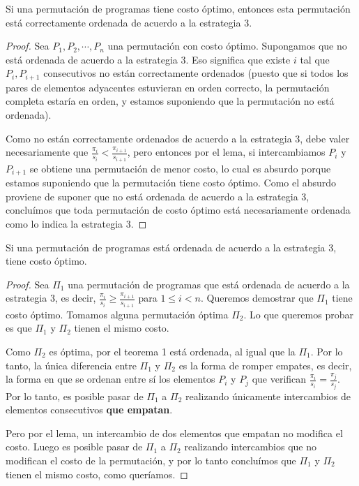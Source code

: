 \documentclass{article}
\begin{document}
\begin{teorema}
Si una permutación de programas tiene costo óptimo, entonces esta permutación está correctamente ordenada de acuerdo a la estrategia 3.
\end{teorema}
\begin{proof}
Sea $P_1, P_2, \cdots, P_n$ una permutación con costo óptimo. Supongamos que no está ordenada de acuerdo a la estrategia 3. Eso significa que existe
$i$ tal que $P_i, P_{i+1}$ consecutivos no están correctamente ordenados (puesto que si todos los pares de elementos adyacentes estuvieran en orden correcto,
la permutación completa estaría en orden, y estamos suponiendo que la permutación no está ordenada).

Como no están correctamente ordenados de acuerdo a la estrategia 3, debe valer necesariamente que $\frac{\pi_i}{s_i} < \frac{\pi_{i+1}}{s_{i+1}}$,
pero entonces por el lema, si intercambiamos $P_i$ y $P_{i+1}$ se obtiene una permutación de menor costo, lo cual es absurdo porque estamos suponiendo
que la permutación tiene costo óptimo. Como el absurdo proviene de suponer que no está ordenada de acuerdo a la estrategia 3, concluímos que toda permutación
de costo óptimo está necesariamente ordenada como lo indica la estrategia 3.
\end{proof}

\begin{teorema}
Si una permutación de programas está ordenada de acuerdo a la estrategia 3, tiene costo óptimo.
\end{teorema}
\begin{proof}
Sea $\Pi_1$ una permutación de programas que está ordenada de acuerdo a la estrategia 3, es decir, $\frac{\pi_i}{s_i} \geq \frac{\pi_{i+1}}{s_{i+1}}$ para $1 \leq i < n$.
Queremos demostrar que $\Pi_1$ tiene costo óptimo. Tomamos alguna permutación óptima $\Pi_2$. Lo que queremos probar es que $\Pi_1$ y $\Pi_2$ tienen el mismo costo.

Como $\Pi_2$ es óptima, por el teorema 1 está ordenada, al igual que la $\Pi_1$. Por lo tanto, la única diferencia entre $\Pi_1$ y $\Pi_2$ es la forma
de romper empates, es decir, la forma en que se ordenan entre sí los elementos $P_i$ y $P_j$ que verifican $\frac{\pi_i}{s_i} = \frac{\pi_{j}}{s_{j}}$.
Por lo tanto, es posible pasar de $\Pi_1$ a $\Pi_2$ realizando únicamente intercambios de elementos consecutivos \textbf{que empatan}.

Pero por el lema, un intercambio de dos elementos que empatan no modifica el costo. Luego es posible pasar de $\Pi_1$ a $\Pi_2$ realizando intercambios
que no modifican el costo de la permutación, y por lo tanto concluímos que $\Pi_1$ y $\Pi_2$ tienen el mismo costo, como queríamos.
\end{proof}

            
        
\end{document}
